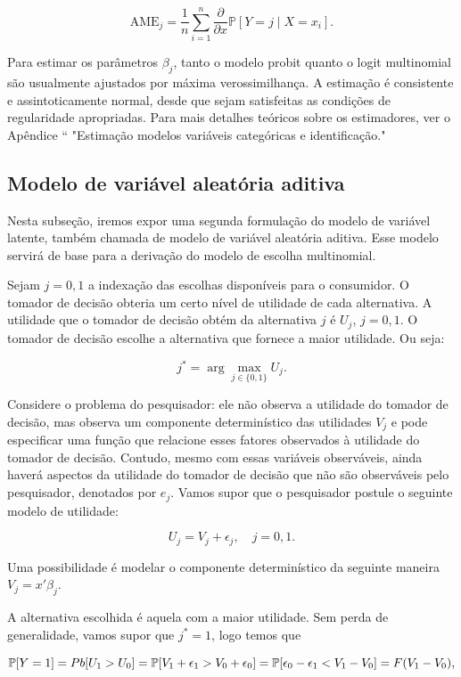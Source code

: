 \documentclass[12pt]{article}
\theoremstyle{break}
\newcommand{\Pb}{\mathbb{P}} %
\begin{document}
\[
\text{AME}_j = \frac{1}{n} \sum_{i=1}^n \frac{\partial}{\partial x} \mathbb{P}[Y = j \mid X = x_i].
\]

Para estimar os parâmetros \( \beta_j \), tanto o modelo probit quanto o logit multinomial são usualmente ajustados por máxima verossimilhança. A estimação é consistente e assintoticamente normal, desde que sejam satisfeitas as condições de regularidade apropriadas. Para mais detalhes teóricos sobre os estimadores, ver o Apêndice `` "Estimação modelos variáveis categóricas e identificação."

\subsection{Modelo de variável aleatória aditiva}


Nesta subseção, iremos expor uma segunda formulação do modelo de variável latente, também chamada de modelo de variável aleatória aditiva. Esse modelo servirá de base para a derivação do modelo de escolha multinomial.

Sejam \( j = 0, 1 \) a indexação das escolhas disponíveis para o consumidor. O tomador de decisão obteria um certo nível de utilidade de cada alternativa. A utilidade que o tomador de decisão obtém da alternativa \( j \) é \( U_{j} \), \( j = 0, 1 \). O tomador de decisão escolhe a alternativa que fornece a maior utilidade. Ou seja:

\[
j^* = \arg\max_{j \in \{0,1\}} U_{j}.
\]

Considere o problema do pesquisador: ele não observa a utilidade do tomador de decisão, mas observa um componente determinístico das utilidades \( V_j \) e pode especificar uma função que relacione esses fatores observados à utilidade do tomador de decisão. Contudo, mesmo com essas variáveis observáveis, ainda haverá aspectos da utilidade do tomador de decisão que não são observáveis pelo pesquisador, denotados por \( e_{j} \). Vamos supor que o pesquisador postule o seguinte modelo de utilidade:

\[
U_{j} = V_j + \epsilon_{j}, \quad j = 0, 1.
\]

Uma possibilidade é modelar o componente determinístico da seguinte maneira \( V_j = {x}'{\beta}_j \).

A alternativa escolhida é aquela com a maior utilidade. Sem perda de generalidade, vamos supor que \( j^* = 1 \), logo temos que 

\[
\Pb[Y = 1] = \\Pb[U_1 > U_0] 
= \Pb[V_1 + \epsilon_1 > V_0 + \epsilon_0] 
= \Pb[\epsilon_0 - \epsilon_1 < V_1 - V_0] 
= F(V_1 - V_0),
\]
\end{document}
